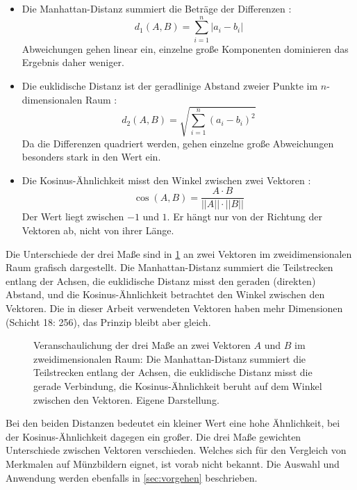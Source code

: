 \begin{itemize}
    \item Die Manhattan-Distanz summiert die Beträge der Differenzen \cite{aggarwal2001surprising}: \[ d_1(A, B) = \sum_{i=1}^{n}|a_i - b_i| \] Abweichungen gehen linear ein, einzelne große Komponenten dominieren das Ergebnis daher weniger.
    \item Die euklidische Distanz ist der geradlinige Abstand zweier Punkte im $n$-dimensionalen Raum \cite{wikipedia-euklidischer-abstand}: \[ d_2(A, B)= \sqrt{\sum_{i=1}^{n}(a_i - b_i)^2} \] Da die Differenzen quadriert werden, gehen einzelne große Abweichungen besonders stark in den Wert ein.
    \item Die Kosinus-Ähnlichkeit misst den Winkel zwischen zwei Vektoren \cite{manning2008introduction}: \[ \cos(A, B) = \frac{A \cdot B}{||A|| \cdot ||B||} \] Der Wert liegt zwischen $ -1 $ und $ 1 $. Er hängt nur von der Richtung der Vektoren ab, nicht von ihrer Länge.
\end{itemize}

\noindent Die Unterschiede der drei Maße sind in \cref{fig:aehnlichkeitsmasse} an zwei Vektoren im zweidimensionalen Raum grafisch dargestellt. Die Manhattan-Distanz summiert die Teilstrecken entlang der Achsen, die euklidische Distanz misst den geraden (direkten) Abstand, und die Kosinus-Ähnlichkeit betrachtet den Winkel zwischen den Vektoren. Die in dieser Arbeit verwendeten Vektoren haben mehr Dimensionen (Schicht 18: 256), das Prinzip bleibt aber gleich.

\begin{figure}[H]
  \centering
  \resizebox{\linewidth}{!}{}
  \caption[Veranschaulichung der Ähnlichkeitsmaße]{Veranschaulichung der drei Maße an zwei Vektoren $A$ und $B$ im zweidimensionalen Raum: Die Manhattan-Distanz summiert die Teilstrecken entlang der Achsen, die euklidische Distanz misst die gerade Verbindung, die Kosinus-Ähnlichkeit beruht auf dem Winkel zwischen den Vektoren. Eigene Darstellung.}
  \label{fig:aehnlichkeitsmasse}
\end{figure}

\noindent Bei den beiden Distanzen bedeutet ein kleiner Wert eine hohe Ähnlichkeit, bei der Kosinus-Ähnlichkeit dagegen ein großer. Die drei Maße gewichten Unterschiede zwischen Vektoren verschieden. Welches sich für den Vergleich von Merkmalen auf Münzbildern eignet, ist vorab nicht bekannt. Die Auswahl und Anwendung werden ebenfalls in \cref{sec:vorgehen} beschrieben.